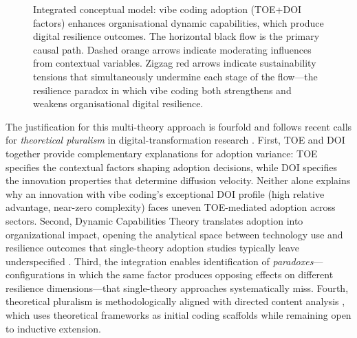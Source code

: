 \documentclass[preprint,12pt,authoryear]{elsarticle}
\begin{document}
\begin{figure}[htbp]
{%
}
\caption{Integrated conceptual model: vibe coding adoption (TOE+DOI factors) enhances organisational dynamic capabilities, which produce digital resilience outcomes. The horizontal black flow is the primary causal path. Dashed orange arrows indicate moderating influences from contextual variables. Zigzag red arrows indicate sustainability tensions that simultaneously undermine each stage of the flow---the resilience paradox in which vibe coding both strengthens and weakens organisational digital resilience.}
\label{fig:conceptual-model}
\end{figure}

The justification for this multi-theory approach is fourfold and follows recent calls for \emph{theoretical pluralism} in digital-transformation research \citep{Hanelt2021}. First, TOE and DOI together provide complementary explanations for adoption variance: TOE specifies the contextual factors shaping adoption decisions, while DOI specifies the innovation properties that determine diffusion velocity. Neither alone explains why an innovation with vibe coding's exceptional DOI profile (high relative advantage, near-zero complexity) faces uneven TOE-mediated adoption across sectors. Second, Dynamic Capabilities Theory translates adoption into organizational impact, opening the analytical space between technology use and resilience outcomes that single-theory adoption studies typically leave underspecified \citep{Warner2019, Teece2018}. Third, the integration enables identification of \emph{paradoxes}---configurations in which the same factor produces opposing effects on different resilience dimensions---that single-theory approaches systematically miss. Fourth, theoretical pluralism is methodologically aligned with directed content analysis \citep{Hsieh2005}, which uses theoretical frameworks as initial coding scaffolds while remaining open to inductive extension.
\end{document}
